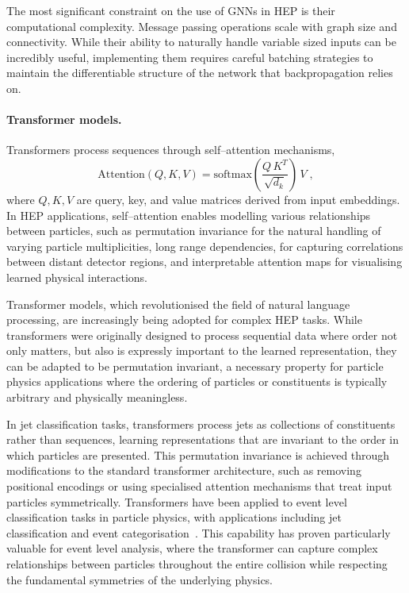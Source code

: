                 The most significant constraint on the use of GNNs in HEP is their computational complexity.
                Message passing operations scale with graph size and connectivity.
                While their ability to naturally handle variable sized inputs can be incredibly useful, implementing them requires careful batching strategies to maintain the differentiable structure of the network that backpropagation relies on.
    
        \paragraph{Transformer models.}
            Transformers process sequences through self--attention mechanisms,
            \begin{equation}
                \text{Attention}(Q, K, V) = \text{softmax}\left(\frac{Q\,K^T}{\sqrt{d_k}}\right)\,V\;,
            \end{equation}
            where \(Q, K, V\) are query, key, and value matrices derived from input embeddings.
            In HEP applications, self--attention enables modelling various relationships between particles, such as
            permutation invariance for the natural handling of varying particle multiplicities,
            long range dependencies, for capturing correlations between distant detector regions,
            and interpretable attention maps for visualising learned physical interactions.
    
            Transformer models, which revolutionised the field of natural language processing, are increasingly being adopted for complex HEP tasks.
            While transformers were originally designed to process sequential data where order not only matters, but also is expressly important to the learned representation, they can be adapted to be permutation invariant, a necessary property for particle physics applications where the ordering of particles or constituents is typically arbitrary and physically meaningless.
            
            In jet classification tasks, transformers process jets as collections of constituents rather than sequences, learning representations that are invariant to the order in which particles are presented.
            This permutation invariance is achieved through modifications to the standard transformer architecture, such as removing positional encodings or using specialised attention mechanisms that treat input particles symmetrically.
            Transformers have been applied to event level classification tasks in particle physics, with applications including jet classification and event categorisation~\cite{Kheddar2025ImageSurvey, mikuni_point_2021, builtjes_attention_2025}.
            This capability has proven particularly valuable for event level analysis, where the transformer can capture complex relationships between particles throughout the entire collision while respecting the fundamental symmetries of the underlying physics.
    
